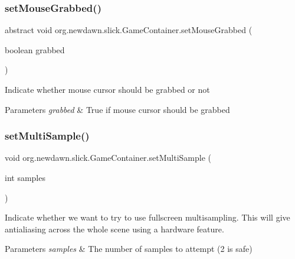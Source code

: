 \subsubsection{\texorpdfstring{set\+Mouse\+Grabbed()}{setMouseGrabbed()}}
{\footnotesize\ttfamily abstract void org.\+newdawn.\+slick.\+Game\+Container.\+set\+Mouse\+Grabbed (\begin{DoxyParamCaption}\item[{boolean}]{grabbed }\end{DoxyParamCaption})\hspace{0.3cm}{\ttfamily [abstract]}}

Indicate whether mouse cursor should be grabbed or not


\begin{DoxyParams}{Parameters}
{\em grabbed} & True if mouse cursor should be grabbed \\
\hline
\end{DoxyParams}
\mbox{\label{classorg_1_1newdawn_1_1slick_1_1_game_container_a5d16330dd52b379bb82725524e0af88c}} 
\subsubsection{\texorpdfstring{set\+Multi\+Sample()}{setMultiSample()}}
{\footnotesize\ttfamily void org.\+newdawn.\+slick.\+Game\+Container.\+set\+Multi\+Sample (\begin{DoxyParamCaption}\item[{int}]{samples }\end{DoxyParamCaption})\hspace{0.3cm}{\ttfamily [inline]}}

Indicate whether we want to try to use fullscreen multisampling. This will give antialiasing across the whole scene using a hardware feature.


\begin{DoxyParams}{Parameters}
{\em samples} & The number of samples to attempt (2 is safe) \\
\hline
\end{DoxyParams}

